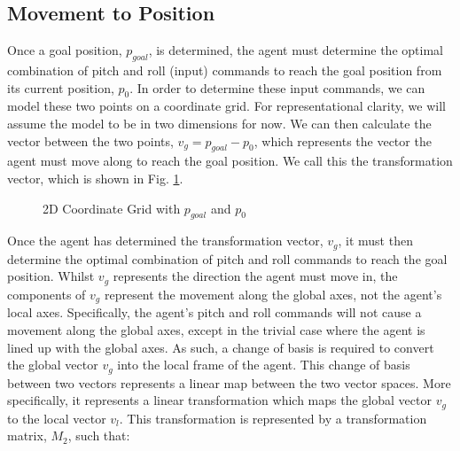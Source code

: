 \documentclass[12pt]{article}
\begin{document}
\subsection{Movement to Position}
Once a goal position, $p_{goal}$, is determined, the agent must determine the optimal combination of pitch and roll (input) commands to reach the goal position from its current position, $p_0$. In order to determine these input commands, we can model these two points on a coordinate grid. For representational clarity, we will assume the model to be in two dimensions for now. We can then calculate the vector between the two points, $v_g = p_{goal} - p_0$, which represents the vector the agent must move along to reach the goal position. We call this the transformation vector, which is shown in Fig. \ref{fig:2d-coords}.

\begin{figure}[ht]
    \centering
    \caption{2D Coordinate Grid with $p_{goal}$ and $p_{0}$}
    \label{fig:2d-coords}
\end{figure}

Once the agent has determined the transformation vector, $v_g$, it must then determine the optimal combination of pitch and roll commands to reach the goal position. Whilst $v_g$ represents the direction the agent must move in, the components of $v_g$ represent the movement along the global axes, not the agent's local axes. Specifically, the agent's pitch and roll commands will not cause a movement along the global axes, except in the trivial case where the agent is lined up with the global axes. As such, a change of basis is required to convert the global vector $v_g$ into the local frame of the agent. This change of basis between two vectors represents a linear map between the two vector spaces. More specifically, it represents a linear transformation which maps the global vector $v_g$ to the local vector $v_l$. This transformation is represented by a transformation matrix, $M_2$, such that:
\end{document}
